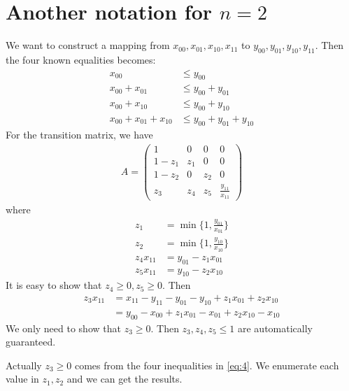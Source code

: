 \documentclass{article}
\begin{document}
\section{Another notation for $n=2$}
We want to construct a mapping from $x_{00}, x_{01},
x_{10}, x_{11}$ to $y_{00}, y_{01},
y_{10}, y_{11}$. Then the four known equalities becomes:
\begin{align}
    x_{00} &\leq y_{00} \label{eq:4}\\
    x_{00} + x_{01} & \leq y_{00} + y_{01} \\
    x_{00} + x_{10} & \leq y_{00} + y_{10} \\
    x_{00} + x_{01} + x_{10} & \leq y_{00}
    + y_{01} + y_{10}
\end{align}
For the transition matrix, we have
\begin{align*}
    A = \begin{pmatrix}
    1 & 0 & 0 & 0 \\
    1-z_1 & z_1 & 0 & 0\\
    1-z_2 & 0 & z_2 & 0 \\
    z_3 & z_4 & z_5 & \frac{y_{11}}{x_{11}}
    \end{pmatrix}
\end{align*}
where
\begin{align*}
    z_1&=\min\{1, \frac{y_{01}}{x_{01}}\}\\
    z_2&=\min\{1, \frac{y_{10}}{x_{10}}\}\\
    z_4x_{11} &= y_{01} - z_1 x_{01} \\
    z_5x_{11} &= y_{10} - z_2 x_{10}
\end{align*}
It is easy to show that $z_4 \geq 0, z_5 \geq 0$.
Then
\begin{align}
    z_3 x_{11} &= x_{11} - y_{11} - y_{01} - y_{10} + z_1 x_{01} + z_2 x_{10} \\
    &= y_{00} - x_{00} + z_1x_{01} - x_{01} + z_2x_{10}-x_{10}
\end{align}
We only need to show that $z_3 \geq 0$.
Then $z_3, z_4, z_5 \leq 1$ are automatically guaranteed.

Actually $z_3 \geq 0$ comes from the four inequalities
in \eqref{eq:4}. We enumerate each value in $z_1, z_2$
and we can get the results.
\end{document}

